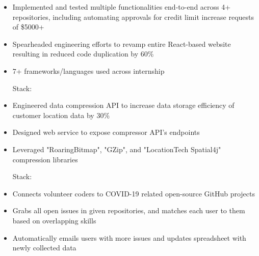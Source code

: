 \documentclass[10pt,a4paper,ragged2e,withhyper]{altacv}
\begin{document}
\begin{paracol}{2}

\begin{itemize}
\item Implemented and tested multiple functionalities end-to-end across 4+ repositories, including automating approvals for credit limit increase requests of \$5000+
\item Spearheaded engineering efforts to revamp entire React-based website resulting in reduced code duplication by 60\%
\item 7+ frameworks/languages used across internship

\smallskip
Stack:

\end{itemize}

\divider

\begin{itemize}
\item Engineered data compression API to increase data storage efficiency of customer location data by 30\%
\item Designed web service to expose compressor API’s endpoints
\item Leveraged "RoaringBitmap", "GZip", and "LocationTech Spatial4j" compression libraries

\smallskip
Stack:

\end{itemize}

\medskip


\begin{itemize}
    \item Connects volunteer coders to COVID-19 related open-source GitHub projects
    \item Grabs all open issues in given repositories, and matches each user to them based on overlapping skills
    \item Automatically emails users with more issues and updates spreadsheet with newly collected data
    

\end{itemize}
\end{paracol}
\end{document}
